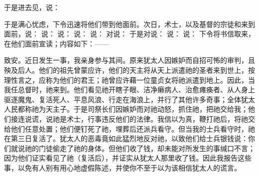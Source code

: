 于是进去见，说：\par

于是满心忧虑，下令迅速将他们带到他面前。次日，术士，以及基督的宗徒和来到面前，说： 说： 说： 说： 说： 对说： 于是对说： 说： 说： 下令将书信取来，在他们面前宣读；内容如下：——\par

致安。近日发生一事，我亲身参与其间。原来犹太人因嫉妒而自招可怖的审判，且殃及后人。他们的祖先曾蒙应许，他们的天主将从天上派遣祂的圣者来到世上，按理性言之，应称为他们的君王；祂曾应许藉一位童贞女将祂派遣到地上。因此，当我任总督时，祂来到。他们看见祂开瞎子眼、洁净癞病人、治愈瘫痪者、从人身上驱逐魔鬼、复活死人、平息风浪、行走在海浪上，并行了其他许多奇事；全体犹太人民都称祂为天主子。于是司祭长们因嫉妒而对祂动怒，抓住祂，把祂交给我；他们接连说谎，说祂是术士，行事违反他们的法律。我信以为真，鞭打祂后，将祂交给他们任意处置；他们便钉死了祂，埋葬后还派兵看守。但当我的士兵看守时，祂在第三日复活了。犹太人的恶毒竟如此猛烈地反对祂，以致他们给士兵银钱说：你们就说祂的门徒偷走了祂的身体。但他们收了钱，却未能对所发生的事缄口不言；因为他们证实看见了祂（复活后），并证实从犹太人那里收了钱。因此我报告这些事，以免有人别有用心地虚假陈述，并使你不至于以为该相信犹太人的谎言。\par

